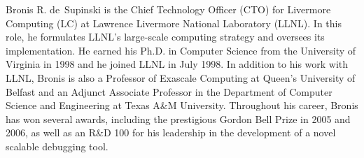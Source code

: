 \begin{IEEEbiography}{Bronis R. de~Supinski}
is the Chief Technology Officer (CTO) for Livermore Computing (LC) at 
Lawrence Livermore National Laboratory (LLNL). In this role, he
formulates LLNL's large-scale computing strategy and oversees its 
implementation. He earned his Ph.D. in Computer Science from the University 
of Virginia in 1998 and he joined LLNL in July 1998. In addition to his work 
with LLNL, Bronis is also a Professor of Exascale Computing at Queen's 
University of Belfast and an Adjunct Associate Professor in the Department 
of Computer Science and Engineering at Texas A&M University. Throughout his 
career, Bronis has won several awards, including the prestigious Gordon Bell 
Prize in 2005 and 2006, as well as an R&D 100 for his leadership in the
development of a novel scalable debugging tool.
\end{IEEEbiography}

